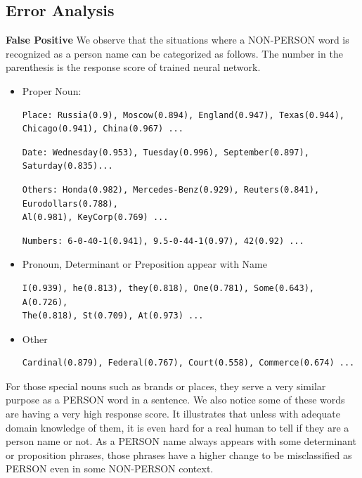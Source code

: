 \documentclass[letterpaper]{article}
\begin{document}
\subsection{Error Analysis}

\textbf{False Positive} We observe that the situations where a NON-PERSON word is recognized as a person name can be categorized as follows. The number in the parenthesis is the response score of trained neural network.
\begin{itemize}
\item Proper Noun:
\begin{verbatim}
Place: Russia(0.9), Moscow(0.894), England(0.947), Texas(0.944),
Chicago(0.941), China(0.967) ...
\end{verbatim}
\begin{verbatim}
Date: Wednesday(0.953), Tuesday(0.996), September(0.897), Saturday(0.835)...
\end{verbatim}
\begin{verbatim}
Others: Honda(0.982), Mercedes-Benz(0.929), Reuters(0.841), Eurodollars(0.788),
Al(0.981), KeyCorp(0.769) ...
\end{verbatim}
\begin{verbatim}
Numbers: 6-0-40-1(0.941), 9.5-0-44-1(0.97), 42(0.92) ...
\end{verbatim}
\item Pronoun, Determinant or Preposition appear with Name
\begin{verbatim}
I(0.939), he(0.813), they(0.818), One(0.781), Some(0.643), A(0.726),
The(0.818), St(0.709), At(0.973) ...
\end{verbatim}
\item Other
\begin{verbatim}
Cardinal(0.879), Federal(0.767), Court(0.558), Commerce(0.674) ...
\end{verbatim}
\end{itemize}
For those special nouns such as brands or places, they serve a very similar purpose as a PERSON word in a sentence. We also notice some of these words are having a very high response score. It illustrates that unless with adequate domain knowledge of them, it is even hard for a real human to tell if they are a person name or not. As a PERSON name always appears with some determinant or proposition phrases, those phrases have a higher change to be misclassified as PERSON even in some NON-PERSON context. 

\vspace{0.1cm}
\end{document}
